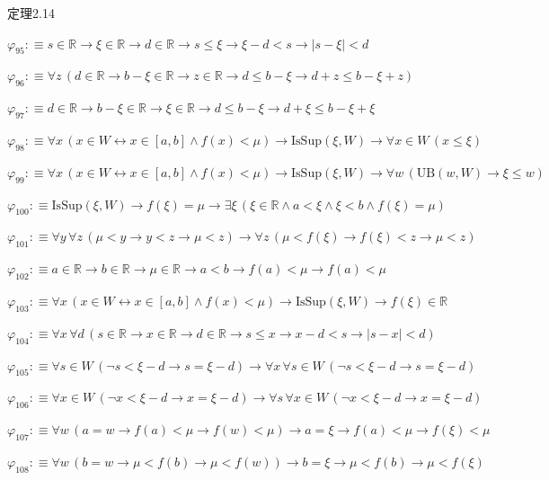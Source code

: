 \begin{fullproof}{定理2.14}
\begin{abbrevlist}
\item $\varphi_{95} :\equiv s \in \mathbb{R} \to \xi \in \mathbb{R} \to d \in \mathbb{R} \to s \leq \xi \to \xi - d < s \to \lvert s - \xi \rvert < d$
\item $\varphi_{96} :\equiv \forall z\,(d \in \mathbb{R} \to b - \xi \in \mathbb{R} \to z \in \mathbb{R} \to d \leq b - \xi \to d + z \leq b - \xi + z)$
\item $\varphi_{97} :\equiv d \in \mathbb{R} \to b - \xi \in \mathbb{R} \to \xi \in \mathbb{R} \to d \leq b - \xi \to d + \xi \leq b - \xi + \xi$
\item $\varphi_{98} :\equiv \forall x\,(x \in W \leftrightarrow x \in [a,b] \land f(x) < \mu) \to \mathrm{IsSup}(\xi,W) \to \forall x \in W\,(x \leq \xi)$
\item $\varphi_{99} :\equiv \forall x\,(x \in W \leftrightarrow x \in [a,b] \land f(x) < \mu) \to \mathrm{IsSup}(\xi,W) \to \forall w\,(\mathrm{UB}(w,W) \to \xi \leq w)$
\item $\varphi_{100} :\equiv \mathrm{IsSup}(\xi,W) \to f(\xi) = \mu \to \exists \xi\,(\xi \in \mathbb{R} \land a < \xi \land \xi < b \land f(\xi) = \mu)$
\item $\varphi_{101} :\equiv \forall y\,\forall z\,(\mu < y \to y < z \to \mu < z) \to \forall z\,(\mu < f(\xi) \to f(\xi) < z \to \mu < z)$
\item $\varphi_{102} :\equiv a \in \mathbb{R} \to b \in \mathbb{R} \to \mu \in \mathbb{R} \to a < b \to f(a) < \mu \to f(a) < \mu$
\item $\varphi_{103} :\equiv \forall x\,(x \in W \leftrightarrow x \in [a,b] \land f(x) < \mu) \to \mathrm{IsSup}(\xi,W) \to f(\xi) \in \mathbb{R}$
\item $\varphi_{104} :\equiv \forall x\,\forall d\,(s \in \mathbb{R} \to x \in \mathbb{R} \to d \in \mathbb{R} \to s \leq x \to x - d < s \to \lvert s - x \rvert < d)$
\item $\varphi_{105} :\equiv \forall s \in W\,(\neg s < \xi - d \to s = \xi - d) \to \forall x\,\forall s \in W\,(\neg s < \xi - d \to s = \xi - d)$
\item $\varphi_{106} :\equiv \forall x \in W\,(\neg x < \xi - d \to x = \xi - d) \to \forall s\,\forall x \in W\,(\neg x < \xi - d \to x = \xi - d)$
\item $\varphi_{107} :\equiv \forall w\,(a = w \to f(a) < \mu \to f(w) < \mu) \to a = \xi \to f(a) < \mu \to f(\xi) < \mu$
\item $\varphi_{108} :\equiv \forall w\,(b = w \to \mu < f(b) \to \mu < f(w)) \to b = \xi \to \mu < f(b) \to \mu < f(\xi)$

\end{abbrevlist}
\end{fullproof}
